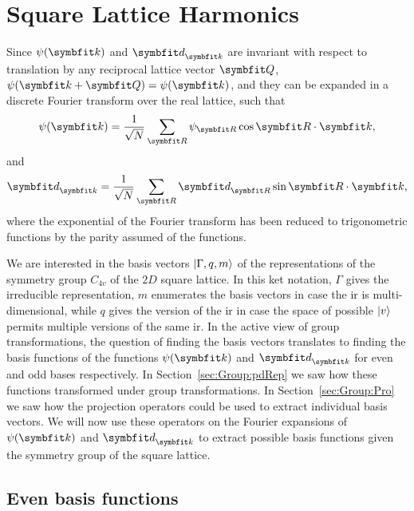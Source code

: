 \section{Square Lattice Harmonics}

Since $\psi(\v{k})$ and $\v{d}_\v{k}$ are invariant with respect to translation by any reciprocal lattice vector $\v{Q}$, $\psi(\v{k}+\v{Q}) = \psi(\v{k})$,
and they can be expanded in a discrete Fourier transform over the real lattice, such that
\begin{equation}
    \label{eq:Group:SLH:psiFourier}
    \psi(\v{k}) = \frac{1}{\sqrt{N}}\sum_\v{R}\psi_\v{R}\cos\v{R}\cdot\v{k},
\end{equation}
and
\begin{equation}
    \label{eq:Group:SLH:dFourier}
    \v{d}_\v{k} = \frac{1}{\sqrt{N}}\sum_\v{R}\v{d}_\v{R}\sin\v{R}\cdot\v{k},
\end{equation}
where the exponential of the Fourier transform has been reduced to trigonometric functions by the parity assumed of the functions.

We are interested in the basis vectors $\lvert \Gamma,q,m \rangle$ of the representations of the symmetry group $C_{4v}$ of the $2D$ square lattice. In this
ket notation, $\Gamma$ gives the irreducible representation, $m$ enumerates the basis vectors in case the \ac{ir} is multi-dimensional, while $q$ gives the version of
the \ac{ir} in case the space of possible $\lvert v \rangle$ permits multiple versions of the same \ac{ir}. In the active
view of group transformations, the question of finding the basis vectors translates to finding the basis functions of the functions $\psi(\v{k})$
and $\v{d}_\v{k}$ for even and odd bases respectively. In Section~\ref{sec:Group:pdRep} we
saw how these functions transformed under group transformations. In Section~\ref{sec:Group:Pro} we saw how the projection operators could be used
to extract individual basis vectors. We will now use these operators on the Fourier expansions of $\psi(\v{k})$ and $\v{d}_\v{k}$ to extract possible
basis functions given the symmetry group of the square lattice.

\subsection{Even basis functions}

